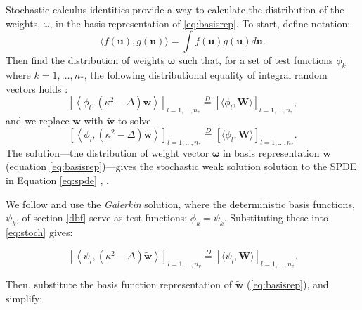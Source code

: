 Stochastic calculus identities provide a way to calculate the distribution of the weights, $\omega$, in the basis representation of \ref{eq:basisrep}. To start, define notation: 
$$\langle f(\pmb{u}), g(\pmb{u}) \rangle = \int f(\pmb{u}) g(\pmb{u}) d\pmb{u}.$$ 
Then find the distribution of weights $\pmb{\omega}$ such that, for a set of test functions $\phi_{k}$ where $k = 1, \dots, n_{*}$, the following distributional equality of integral random vectors holds \citep{Lindgren2011}:
\begin{equation} %
\left[ \left< \phi_{l}, (\kappa^{2} - \Delta) \pmb{w} \right> \right]_{l = 1, \hdots, n_{*}} 
\overset{D}{=}
\left[ \langle \phi_{l}, \pmb{W} \rangle \right]_{l = 1, \hdots, n_{*}}, \nonumber
\end{equation}
and we replace $\pmb{w}$ with $\widetilde{\pmb{w}}$ to solve
\begin{equation}  \label{eq:stoch} %
\left[ \left< \phi_{l}, (\kappa^{2} - \Delta) \widetilde{\pmb{w}} \right> \right]_{l = 1, \hdots, n_{*}} 
\overset{D}{=}
\left[ \langle \phi_{l}, \pmb{W} \rangle \right]_{l = 1, \hdots, n_{*}}.
\end{equation}
The solution---the distribution of weight vector $\pmb{\omega}$ in basis representation $\widetilde{\pmb{w}}$ (equation \ref{eq:basisrep})---gives the stochastic weak solution solution to the SPDE in Equation \ref{eq:spde} \citep{Mao2007}, \citep{Lindstrom2014}. 

We follow \cite{Lindgren2011} and use the {\it Galerkin} solution, where the deterministic basis functions, $\psi_{k}$,  of section \ref{dbf} serve as test functions: $\phi_{k} = \psi_{k}$. Substituting these into \ref{eq:stoch} gives:

\begin{equation} \label{eq:stoch2} %
\left[ \left< \psi_{l}, (\kappa^{2} - \Delta) \widetilde{\pmb{w}} \right> \right]_{l = 1, \hdots, n_{v}} 
\overset{D}{=}
\left[ \langle \psi_{l}, \pmb{W} \rangle \right]_{l = 1, \hdots, n_{v}}.
\end{equation}

Then, substitute the basis function representation of $\widetilde{\pmb{w}}$ (\ref{eq:basisrep}), and simplify:


